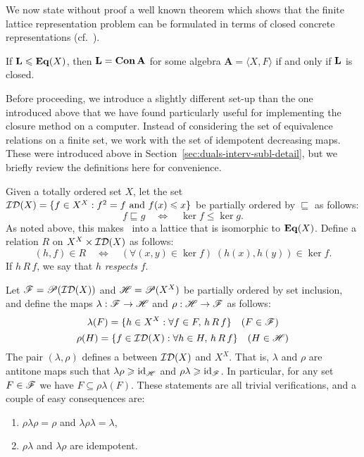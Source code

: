 We now state without proof a well known theorem which shows that the finite lattice
representation problem can be formulated in terms of closed concrete
representations (cf.~\cite{Jonsson:1972}).
\begin{theorem}\label{Concrete-thm-3}
  If $\mathbf{L} \leqslant \mathbf{Eq}(X)$, then $\mathbf{L}= \mathbf{Con\,}\mathbf{A}$ for some algebra 
  $\mathbf{A} = \langle X, F\rangle$ if and only if $\mathbf{L}$ is closed.
\end{theorem}

Before proceeding, we introduce a slightly different set-up than the
one introduced above that we have found particularly useful
for implementing the closure method on a computer. Instead of considering the
set of equivalence relations on a finite set, we work with the set of idempotent
decreasing maps.  These were introduced above in
Section~\ref{sec:duals-interv-subl-detail}, but we briefly review the definitions here
for convenience.

Given a totally ordered set $X$, 
let the set $\mathcal{ID}(X) = \{f\in X^X: f^2 = f \text{ and } f(x) \leqslant x\}$ be partially
ordered by $\sqsubseteq$ as follows:
\[
f\sqsubseteq g \quad \Leftrightarrow \quad \ker f \leq \ker g.  
\]
As noted above, 
this makes \idemdec\ into a lattice that is isomorphic to $\mathbf{Eq}(X)$.   
Define a relation $R$ on $X^X \times \mathcal{ID}(X)$ as follows: 
\[
(h,f) \in R \quad \Leftrightarrow \quad (\forall (x,y) \in \ker f)\; (h(x),h(y))
\in \ker f.
\]
If $h\, R\, f$, we say that  $h$ \emph{respects} $f$.

Let $\mathscr{F} = \mathscr{P}(\mathcal{ID}(X))$ and $\mathscr{H} = \mathscr{P}(X^X)$ be partially ordered by set
inclusion, and define the maps 
$\lambda: \mathscr{F} \rightarrow \mathscr{H}$ and $\rho: \mathscr{H} \rightarrow \mathscr{F}$ as follows:
\[
\lambda(F) = \{h\in X^X: \forall f\in F,\, h\, R \,f\} \quad (F \in \mathscr{F})
\]
\[
\rho(H) = \{f\in \mathcal{ID}(X): \forall h\in H,\, h\, R\, f\} \quad (H \in \mathscr{H})
\]
The pair $(\lambda, \rho)$ defines a  between
$\mathcal{ID}(X)$ and $X^X$.  That is, $\lambda$ and $\rho$ are 
antitone %
maps such that $\lambda \rho \geqslant \operatorname{id}_{\mathscr{H}}$ and $\rho
\lambda \geqslant \operatorname{id}_{\mathscr{F}}$.  In particular, for any set $F \in \mathscr{F}$ we have 
$F \subseteq \rho \lambda (F)$.  These statements are all trivial verifications, and
a couple of easy consequences are:
\begin{enumerate}
\item  $\rho\lambda\rho = \rho$ and $\lambda\rho \lambda= \lambda$,
\item $\rho \lambda$ and $\lambda \rho$ are idempotent.
\end{enumerate}


